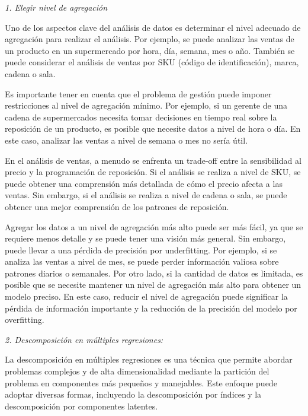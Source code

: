 \documentclass[
]{book}
\begin{document}
\emph{1. Elegir nivel de agregación}

Uno de los aspectos clave del análisis de datos es determinar el nivel
adecuado de agregación para realizar el análisis. Por ejemplo, se puede
analizar las ventas de un producto en un supermercado por hora, día,
semana, mes o año. También se puede considerar el análisis de ventas por
SKU (código de identificación), marca, cadena o sala.

Es importante tener en cuenta que el problema de gestión puede imponer
restricciones al nivel de agregación mínimo. Por ejemplo, si un gerente
de una cadena de supermercados necesita tomar decisiones en tiempo real
sobre la reposición de un producto, es posible que necesite datos a
nivel de hora o día. En este caso, analizar las ventas a nivel de semana
o mes no sería útil.

En el análisis de ventas, a menudo se enfrenta un trade-off entre la
sensibilidad al precio y la programación de reposición. Si el análisis
se realiza a nivel de SKU, se puede obtener una comprensión más
detallada de cómo el precio afecta a las ventas. Sin embargo, si el
análisis se realiza a nivel de cadena o sala, se puede obtener una mejor
comprensión de los patrones de reposición.

Agregar los datos a un nivel de agregación más alto puede ser más fácil,
ya que se requiere menos detalle y se puede tener una visión más
general. Sin embargo, puede llevar a una pérdida de precisión por
underfitting. Por ejemplo, si se analiza las ventas a nivel de mes, se
puede perder información valiosa sobre patrones diarios o semanales. Por
otro lado, si la cantidad de datos es limitada, es posible que se
necesite mantener un nivel de agregación más alto para obtener un modelo
preciso. En este caso, reducir el nivel de agregación puede significar
la pérdida de información importante y la reducción de la precisión del
modelo por overfitting.

\emph{2. Descomposición en múltiples regresiones:}

La descomposición en múltiples regresiones es una técnica que permite
abordar problemas complejos y de alta dimensionalidad mediante la
partición del problema en componentes más pequeños y manejables. Este
enfoque puede adoptar diversas formas, incluyendo la descomposición por
índices y la descomposición por componentes latentes.
\end{document}

